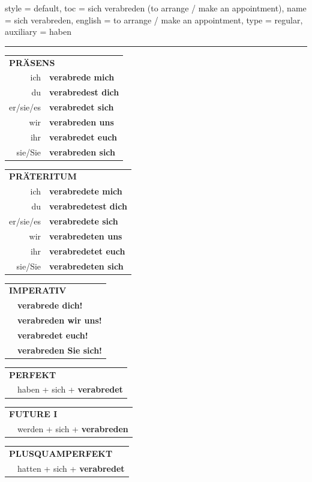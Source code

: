 \begin{verbentry}{
  style = {default},
  toc = {sich verabreden (to arrange / make an appointment)},
  name = {sich verabreden},
  english = {to arrange / make an appointment},
  type = {regular},
  auxiliary = {haben}
}


\vspace{5pt}
\hrule
\vspace{5pt}

\begin{tabular}{rl}
\multicolumn{2}{l}{\textbf{PRÄSENS}}\\
ich & \textbf{verabrede mich}\\
du & \textbf{verabredest dich}\\
er/sie/es & \textbf{verabredet sich}\\
wir & \textbf{verabreden uns}\\
ihr & \textbf{verabredet euch}\\
sie/Sie & \textbf{verabreden sich}\\
\end{tabular}
\hfill
\begin{tabular}{rl}
\multicolumn{2}{l}{\textbf{PRÄTERITUM}}\\
ich & \textbf{verabredete mich}\\
du & \textbf{verabredetest dich}\\
er/sie/es & \textbf{verabredete sich}\\
wir & \textbf{verabredeten uns}\\
ihr & \textbf{verabredetet euch}\\
sie/Sie & \textbf{verabredeten sich}\\
\end{tabular}
\hfill
\begin{tabular}{rl}
\multicolumn{2}{l}{\textbf{IMPERATIV}}\\
& \textbf{verabrede dich!}\\
& \textbf{verabreden wir uns!}\\
& \textbf{verabredet euch!}\\
& \textbf{verabreden Sie sich!}\\
\end{tabular}

\vspace{10pt}

\begin{tabular}{rl}
\multicolumn{2}{l}{\textbf{PERFEKT}}\\
& haben + sich + \textbf{verabredet}\\
\end{tabular}
\hfill
\begin{tabular}{rl}
\multicolumn{2}{l}{\textbf{FUTURE I}}\\
& werden + sich + \textbf{verabreden}\\
\end{tabular}
\hfill
\begin{tabular}{rl}
\multicolumn{2}{l}{\textbf{PLUSQUAMPERFEKT}}\\
& hatten + sich + \textbf{verabredet}\\
\end{tabular}


\end{verbentry}
